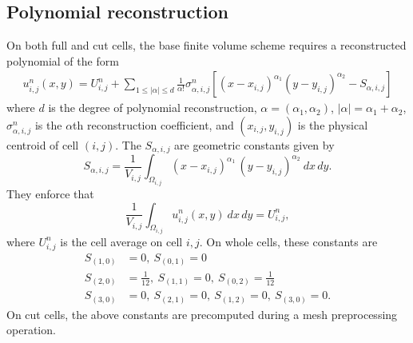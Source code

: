 \subsection{Polynomial reconstruction} \label{sec:ho_reconstruction}
On both full and cut cells, the base finite volume scheme requires a reconstructed polynomial of the form
\begin{equation}\label{eq:uu}
\begin{aligned}
u^n_{i,j} (x,y) = U^n_{i,j} +  \sum_{1 \leq |\alpha| \leq d}  \frac{1}{\alpha!} \sigma^n_{\alpha,i,j} [(x- x_{i,j})^{\alpha_1}(y-y_{i,j})^{\alpha_2}- S_{\alpha,i,j}]
\end{aligned}
\end{equation}
where $d$ is the degree of polynomial reconstruction,
$\alpha = (\alpha_1, \alpha_2)$, $|\alpha| = \alpha_1 + \alpha_2$, $\sigma^n_{\alpha,i,j}$ is the $\alpha$th reconstruction coefficient, and $ (x_{i,j}, y_{i,j})$ is the physical centroid of cell $(i,j)$. 
The $  S_{\alpha, i,j}$ are geometric constants given by
$$
S_{\alpha, i,j} = \frac{1}{ V_{i,j}}  \int_{\Omega_{i,j}} 
(x-x_{i,j})^{\alpha_1} \, (y-y_{i,j})^{\alpha_2} ~ dx \, dy .
$$
They enforce that 
\begin{equation} \label{eq:uaverage}
\frac{1}{ V_{i,j}}  \int_{\Omega_{i,j}} u^n_{i,j}(x,y) ~dx\,dy = U^n_{i,j},
\end{equation}
where  $U^n_{i,j}$ is the cell average on cell $i,j$.  On whole cells, 
these constants are
\begin{equation}
	\begin{aligned}
		S_{(1,0)} &= 0, ~ S_{(0,1)} = 0 \\
		S_{(2,0)} &= \frac{1}{12}, ~ S_{(1,1)} = 0, ~ S_{(0,2)} = \frac{1}{12}\\
		S_{(3,0)} &= 0, ~ S_{(2,1)} = 0, ~ S_{(1,2)} = 0, ~ S_{(3,0)} = 0.
	\end{aligned}
\end{equation}
On cut cells, the above constants are precomputed during a mesh preprocessing operation.

